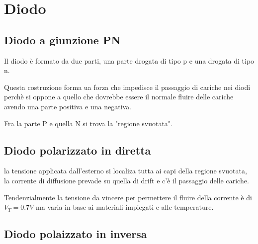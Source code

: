 \section{Diodo}
\subsection{Diodo a giunzione PN}

Il diodo è formato da due parti, una parte drogata di tipo p e una drogata di tipo n.

Questa costruzione forma ua forza che impedisce il passaggio di cariche nei diodi perchè si oppone 
a quello che dovrebbe essere il normale fluire delle  cariche avendo una parte positiva e una negativa.

Fra la parte P e quella N si trova la "regione svuotata".

\subsection{Diodo polarizzato in diretta}

la tensione applicata dall'esterno si localiza tutta ai capi della regione svuotata, la corrente di diffusione prevade su quella di drift e c'è il passaggio delle cariche.


Tendenzialmente la tensione da vincere per permettere il fluire della corrente è di $V_T = 0.7V$ ma varia in base ai materiali impiegati e alle temperature.

\subsection{Diodo polaizzato in inversa}


